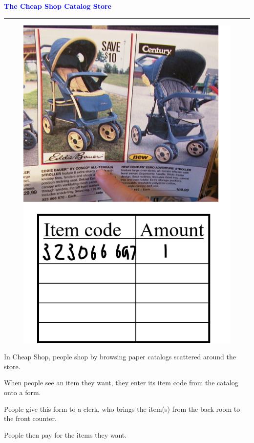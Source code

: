 \documentclass[pdf]{beamer}
\begin{document}
{%
\begin{frame}
	\vspace{8mm}
	\textcolor{Blue}{\textbf{\Large{The Cheap Shop Catalog Store}}}
    \textcolor{red}{\rule{10cm}{1mm}}


\begin{figure}
      \centering
      \includegraphics[scale = 0.4]{21_imagine.png}
\end{figure}
    \bigskip
    In Cheap Shop, people shop by browsing paper catalogs scattered around the store.

    \bigskip

    When people see an item they want, they enter its item code from the catalog onto a form.

    \bigskip

    People give this form to a clerk, who brings the item(s) from the back room to the front counter. 

    \bigskip

    People then pay for the items they want.

\end{frame}}
\end{document}

